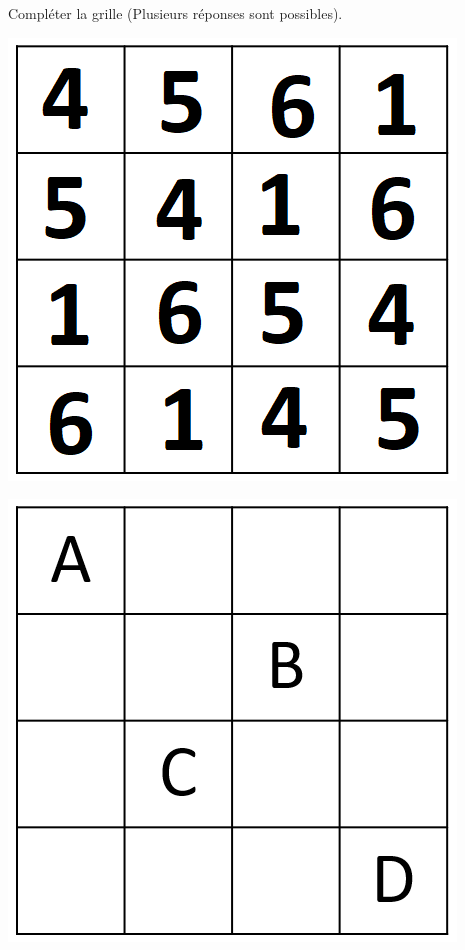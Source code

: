 \begin{questions}
		\question[2] Compléter la grille (Plusieurs réponses sont possibles).
		\begin{solution}
			\begin{center}
				\includegraphics[scale=0.5]{img/grille2}
			\end{center}
		\end{solution}
		
	\end{questions}

	\begin{center}
		\includegraphics[scale=0.5]{img/grille}
	\end{center}
